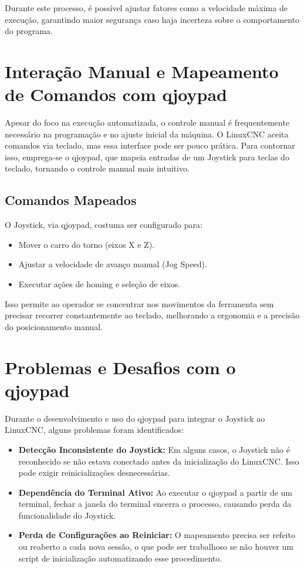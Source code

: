 Durante este processo, é possível ajustar fatores como a velocidade máxima de execução, garantindo maior segurança caso haja incerteza sobre o comportamento do programa.

\section{Interação Manual e Mapeamento de Comandos com qjoypad}

Apesar do foco na execução automatizada, o controle manual é frequentemente necessário na programação e no ajuste inicial da máquina. O LinuxCNC aceita comandos via teclado, mas essa interface pode ser pouco prática. Para contornar isso, emprega-se o qjoypad, que mapeia entradas de um Joystick para teclas do teclado, tornando o controle manual mais intuitivo.

\subsection{Comandos Mapeados}

O Joystick, via qjoypad, costuma ser configurado para:

\begin{itemize}
    \item Mover o carro do torno (eixos X e Z).
    \item Ajustar a velocidade de avanço manual (Jog Speed).
    \item Executar ações de homing e seleção de eixos.
\end{itemize}

Isso permite ao operador se concentrar nos movimentos da ferramenta sem precisar recorrer constantemente ao teclado, melhorando a ergonomia e a precisão do posicionamento manual.

\section{Problemas e Desafios com o qjoypad}

Durante o desenvolvimento e uso do qjoypad para integrar o Joystick ao LinuxCNC, alguns problemas foram identificados:

\begin{itemize}
    \item \textbf{Detecção Inconsistente do Joystick:} Em alguns casos, o Joystick não é reconhecido se não estava conectado antes da inicialização do LinuxCNC. Isso pode exigir reinicializações desnecessárias.
    \item \textbf{Dependência do Terminal Ativo:} Ao executar o qjoypad a partir de um terminal, fechar a janela do terminal encerra o processo, causando perda da funcionalidade do Joystick.
    \item \textbf{Perda de Configurações ao Reiniciar:} O mapeamento precisa ser refeito ou reaberto a cada nova sessão, o que pode ser trabalhoso se não houver um script de inicialização automatizando esse procedimento.
\end{itemize}

